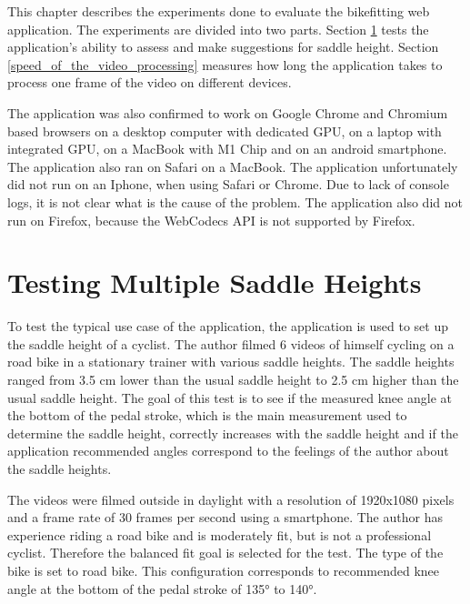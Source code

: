 This chapter describes the experiments done to evaluate the bikefitting web application. The experiments are divided into two parts. Section \ref{assesment_of_multiple_saddle_heights} tests the application's ability to assess and make suggestions for saddle height. Section \ref{speed_of_the_video_processing} measures how long the application takes to process one frame of the video on different devices.

The application was also confirmed to work on Google Chrome and Chromium based browsers on a desktop computer with dedicated GPU, on a laptop with integrated GPU, on a MacBook with M1 Chip and on an android smartphone. The application also ran on Safari on a MacBook. The application unfortunately did not run on an Iphone, when using Safari or Chrome. Due to lack of console logs, it is not clear what is the cause of the problem. The application also did not run on Firefox, because the WebCodecs API is not supported by Firefox.

\section{Testing Multiple Saddle Heights}
\label{assesment_of_multiple_saddle_heights}
To test the typical use case of the application, the application is used to set up the saddle height of a cyclist. The author filmed 6 videos of himself cycling on a road bike in a stationary trainer with various saddle heights. The saddle heights ranged from 3.5 cm lower than the usual saddle height to 2.5 cm higher than the usual saddle height. The goal of this test is to see if the measured knee angle at the bottom of the pedal stroke, which is the main measurement used to determine the saddle height, correctly increases with the saddle height and if the application recommended angles correspond to the feelings of the author about the saddle heights.

The videos were filmed outside in daylight with a resolution of 1920x1080 pixels and a frame rate of 30 frames per second using a smartphone. The author has experience riding a road bike and is moderately fit, but is not a professional cyclist. Therefore the balanced fit goal is selected for the test. The type of the bike is set to road bike. This configuration corresponds to recommended knee angle at the bottom of the pedal stroke of 135° to 140°.




